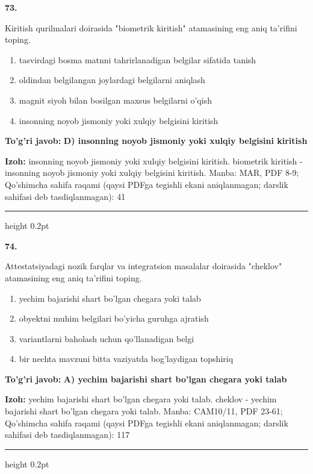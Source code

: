 \documentclass[10pt,a4paper]{article}
\begin{document}
{\bfseries\sffamily\color{ink} 73.}
\par
Kiritish qurilmalari doirasida "biometrik kiritish" atamasining eng aniq ta'rifini toping.
\begin{enumerate}[label=\Alph*),leftmargin=9mm]
\item tasvirdagi bosma matnni tahrirlanadigan belgilar sifatida tanish
\item oldindan belgilangan joylardagi belgilarni aniqlash
\item magnit siyoh bilan bosilgan maxsus belgilarni o'qish
\item insonning noyob jismoniy yoki xulqiy belgisini kiritish
\end{enumerate}
\begin{tcolorbox}[enhanced,breakable,colback=teal!4,colframe=teal!60!black,boxrule=0.45pt,arc=1.2mm,left=2.7mm,right=2.7mm,top=1.8mm,bottom=1.8mm,before skip=2mm,after skip=2mm]
{\bfseries\sffamily\color{teal}To'g'ri javob:} \textbf{D) insonning noyob jismoniy yoki xulqiy belgisini kiritish}
\par\smallskip
{\bfseries Izoh:} insonning noyob jismoniy yoki xulqiy belgisini kiritish. biometrik kiritish - insonning noyob jismoniy yoki xulqiy belgisini kiritish. Manba: MAR, PDF 8-9; Qo'shimcha sahifa raqami (qaysi PDFga tegishli ekani aniqlanmagan; darslik sahifasi deb tasdiqlanmagan): 41
\end{tcolorbox}
\vspace{2mm}\hrule height 0.2pt\vspace{3mm}

{\bfseries\sffamily\color{ink} 74.}
\par
Attestatsiyadagi nozik farqlar va integratsion masalalar doirasida "cheklov" atamasining eng aniq ta'rifini toping.
\begin{enumerate}[label=\Alph*),leftmargin=9mm]
\item yechim bajarishi shart bo'lgan chegara yoki talab
\item obyektni muhim belgilari bo'yicha guruhga ajratish
\item variantlarni baholash uchun qo'llanadigan belgi
\item bir nechta mavzuni bitta vaziyatda bog'laydigan topshiriq
\end{enumerate}
\begin{tcolorbox}[enhanced,breakable,colback=teal!4,colframe=teal!60!black,boxrule=0.45pt,arc=1.2mm,left=2.7mm,right=2.7mm,top=1.8mm,bottom=1.8mm,before skip=2mm,after skip=2mm]
{\bfseries\sffamily\color{teal}To'g'ri javob:} \textbf{A) yechim bajarishi shart bo'lgan chegara yoki talab}
\par\smallskip
{\bfseries Izoh:} yechim bajarishi shart bo'lgan chegara yoki talab. cheklov - yechim bajarishi shart bo'lgan chegara yoki talab. Manba: CAM10/11, PDF 23-61; Qo'shimcha sahifa raqami (qaysi PDFga tegishli ekani aniqlanmagan; darslik sahifasi deb tasdiqlanmagan): 117
\end{tcolorbox}
\vspace{2mm}\hrule height 0.2pt\vspace{3mm}
\end{document}
